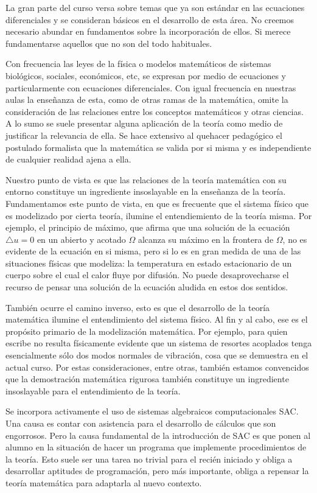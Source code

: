 \begin{enumerate}
	La gran parte del curso versa sobre temas que ya son estándar en las ecuaciones diferenciales y se consideran básicos en el desarrollo de esta área. No creemos necesario abundar en fundamentos sobre la incorporación de ellos. Si merece fundamentarse aquellos que no son del todo habituales.

	Con frecuencia las leyes de la física o modelos matemáticos de sistemas biológicos, sociales, económicos, etc, se expresan por medio de ecuaciones y particularmente con ecuaciones diferenciales. Con igual frecuencia en nuestras aulas la enseñanza de esta, como de otras  ramas de la matemática, omite la consideración de las relaciones entre los conceptos matemáticos y otras ciencias. A lo sumo se suele presentar alguna aplicación de la teoría como medio de justificar la relevancia de ella. Se hace extensivo al quehacer pedagógico  el postulado formalista que la matemática se valida por si misma y es independiente de cualquier  realidad ajena a ella.

	Nuestro punto de vista es que las relaciones de la teoría matemática con su entorno constituye un ingrediente insoslayable en la enseñanza de la teoría.  Fundamentamos este punto de vista, en que es frecuente que el sistema físico  que es modelizado por cierta teoría, ilumine el entendiemiento de la teoría misma. Por ejemplo, el principio de máximo, que afirma que una solución de la ecuación $\triangle u=0$ en un abierto y acotado $\Omega$ alcanza su máximo en la frontera de $\Omega$, no es evidente de la ecuación en si misma, pero si lo es en gran medida de una de las situaciones físicas que modeliza:  la temperatura en estado estacionario de un cuerpo sobre el cual el calor fluye por difusión. No puede desaprovecharse el recurso de pensar una solución de la ecuación aludida en estos dos sentidos.

	También ocurre el camino inverso, esto es que el desarrollo de la teoría matemática ilumine el entendimiento del sistema físico. Al fin y al cabo, ese es el propósito primario de la modelización matemática. Por ejemplo, para quien escribe no resulta físicamente evidente que un sistema de resortes acoplados tenga esencialmente sólo dos modos normales de vibración, cosa que se demuestra en el actual curso. Por estas consideraciones, entre otras, también estamos convencidos que la demostración matemática rigurosa también constituye un ingrediente insoslayable para el entendimiento de la teoría.

	Se incorpora activamente el uso de sistemas algebraicos computacionales SAC.  Una causa es contar con asistencia para el desarrollo de cálculos que son engorrosos. Pero la causa fundamental de la introducción de SAC es que ponen al alumno en la situación de hacer un programa que implemente procedimientos de la teoría. Esto suele ser una tarea no trivial para el recién iniciado y obliga a desarrollar aptitudes de programación, pero más importante, obliga a repensar la teoría matemática para adaptarla al nuevo contexto.


\end{enumerate}
